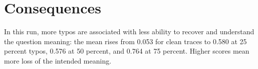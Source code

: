 \documentclass[11pt]{article}
\begin{document}
\section*{Consequences} In this run, more typos are associated with less ability to recover and understand the question meaning: the mean rises from 0.053 for clean traces to 0.580 at 25 percent typos, 0.576 at 50 percent, and 0.764 at 75 percent. Higher scores mean more loss of the intended meaning.
\end{document}
